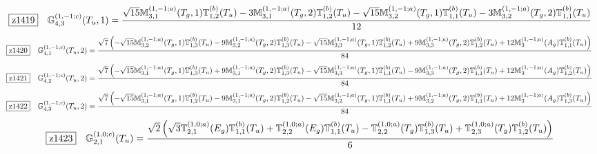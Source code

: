 \documentclass[fleqn,10pt,landscape]{jsarticle}
\begin{document}
\begin{dmath*}
\hspace*{3mm}\fbox{z1419}\quad \mathbb{G}_{4,3}^{(1,-1;c)}(T_{u},1)=\frac{\sqrt{15} \mathbb{M}_{3,1}^{(1,-1;a)}(T_{g},1) \mathbb{T}_{1,2}^{(b)}(T_{u}) - 3 \mathbb{M}_{3,1}^{(1,-1;a)}(T_{g},2) \mathbb{T}_{1,2}^{(b)}(T_{u}) - \sqrt{15} \mathbb{M}_{3,2}^{(1,-1;a)}(T_{g},1) \mathbb{T}_{1,1}^{(b)}(T_{u}) - 3 \mathbb{M}_{3,2}^{(1,-1;a)}(T_{g},2) \mathbb{T}_{1,1}^{(b)}(T_{u})}{12}
\end{dmath*}
\begin{dmath*}
\hspace*{3mm}\fbox{z1420}\quad \mathbb{G}_{4,1}^{(1,-1;c)}(T_{u},2)=\frac{\sqrt{7} \left(- \sqrt{15} \mathbb{M}_{3,2}^{(1,-1;a)}(T_{g},1) \mathbb{T}_{1,3}^{(b)}(T_{u}) - 9 \mathbb{M}_{3,2}^{(1,-1;a)}(T_{g},2) \mathbb{T}_{1,3}^{(b)}(T_{u}) - \sqrt{15} \mathbb{M}_{3,3}^{(1,-1;a)}(T_{g},1) \mathbb{T}_{1,2}^{(b)}(T_{u}) + 9 \mathbb{M}_{3,3}^{(1,-1;a)}(T_{g},2) \mathbb{T}_{1,2}^{(b)}(T_{u}) + 12 \mathbb{M}_{3}^{(1,-1;a)}(A_{g}) \mathbb{T}_{1,1}^{(b)}(T_{u})\right)}{84}
\end{dmath*}
\begin{dmath*}
\hspace*{3mm}\fbox{z1421}\quad \mathbb{G}_{4,2}^{(1,-1;c)}(T_{u},2)=\frac{\sqrt{7} \left(- \sqrt{15} \mathbb{M}_{3,1}^{(1,-1;a)}(T_{g},1) \mathbb{T}_{1,3}^{(b)}(T_{u}) + 9 \mathbb{M}_{3,1}^{(1,-1;a)}(T_{g},2) \mathbb{T}_{1,3}^{(b)}(T_{u}) - \sqrt{15} \mathbb{M}_{3,3}^{(1,-1;a)}(T_{g},1) \mathbb{T}_{1,1}^{(b)}(T_{u}) - 9 \mathbb{M}_{3,3}^{(1,-1;a)}(T_{g},2) \mathbb{T}_{1,1}^{(b)}(T_{u}) + 12 \mathbb{M}_{3}^{(1,-1;a)}(A_{g}) \mathbb{T}_{1,2}^{(b)}(T_{u})\right)}{84}
\end{dmath*}
\begin{dmath*}
\hspace*{3mm}\fbox{z1422}\quad \mathbb{G}_{4,3}^{(1,-1;c)}(T_{u},2)=\frac{\sqrt{7} \left(- \sqrt{15} \mathbb{M}_{3,1}^{(1,-1;a)}(T_{g},1) \mathbb{T}_{1,2}^{(b)}(T_{u}) - 9 \mathbb{M}_{3,1}^{(1,-1;a)}(T_{g},2) \mathbb{T}_{1,2}^{(b)}(T_{u}) - \sqrt{15} \mathbb{M}_{3,2}^{(1,-1;a)}(T_{g},1) \mathbb{T}_{1,1}^{(b)}(T_{u}) + 9 \mathbb{M}_{3,2}^{(1,-1;a)}(T_{g},2) \mathbb{T}_{1,1}^{(b)}(T_{u}) + 12 \mathbb{M}_{3}^{(1,-1;a)}(A_{g}) \mathbb{T}_{1,3}^{(b)}(T_{u})\right)}{84}
\end{dmath*}
\begin{dmath*}
\hspace*{3mm}\fbox{z1423}\quad \mathbb{G}_{2,1}^{(1,0;c)}(T_{u})=\frac{\sqrt{2} \left(\sqrt{3} \mathbb{T}_{2,1}^{(1,0;a)}(E_{g}) \mathbb{T}_{1,1}^{(b)}(T_{u}) + \mathbb{T}_{2,2}^{(1,0;a)}(E_{g}) \mathbb{T}_{1,1}^{(b)}(T_{u}) - \mathbb{T}_{2,2}^{(1,0;a)}(T_{g}) \mathbb{T}_{1,3}^{(b)}(T_{u}) + \mathbb{T}_{2,3}^{(1,0;a)}(T_{g}) \mathbb{T}_{1,2}^{(b)}(T_{u})\right)}{6}
\end{dmath*}
\end{document}
